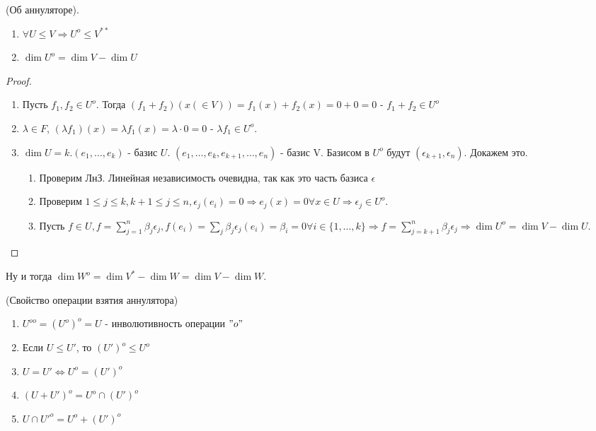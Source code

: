 \begin{theorem}
	(Об аннуляторе). \newline
	\begin{enumerate}
		\item \(\forall U\le V\Longrightarrow U^o \le V^{**}\)
		\item \(\dim U^o = \dim V - \dim U\)
	\end{enumerate}
\end{theorem}
\begin{proof}
	\begin{enumerate}
		\item Пусть \(f_1, f_2\in U^o\). Тогда \((f_1+f_2)(x(\in V)) = f_1(x) + f_2(x) = 0 + 0 = 0\) - \(f_1 + f_2\in U^o\)
		\item \(\lambda\in F\), \((\lambda f_1)(x) = \lambda f_1(x) = \lambda\cdot 0 = 0\) - \(\lambda f_1\in U^o\).
		\item \(\dim U = k. (e_1, \ldots, e_k)\) - базис \(U\). \((e_1, \ldots, e_k, e_{k+1}, \ldots, e_n)\) - базис V. Базисом в \(U^o\) будут \((\epsilon_{k+1}, \epsilon_n)\). Докажем это. 
		\begin{enumerate}
			\item Проверим ЛнЗ. Линейная независимость очевидна, так как это часть базиса \(\epsilon\)
			\item Проверим \(1\le j\le k, k+1\le j\le n, \epsilon_j(e_i) = 0\Longrightarrow e_j(x) = 0\forall x\in U\Longrightarrow \epsilon_j\in U^o\). 
			\item Пусть \(f\in U, f = \sum_{j=1}^{n}\beta_j\epsilon_j, f(e_i) = \sum_j \beta_j \epsilon_j(e_i) = \beta_i = 0 \forall i \in \{1,\ldots, k\} \Longrightarrow f = \sum_{j=k+1}^{n}\beta_j\epsilon_j\Longrightarrow \dim U^o = \dim V - \dim U\).
		\end{enumerate}
	\end{enumerate}
\end{proof}
Ну и тогда \(\dim W^o = \dim V^{*}-\dim W = \dim V - \dim W\).
\begin{theorem}
	(Свойство операции взятия аннулятора) \newline
	\begin{enumerate}
		\item \(U^{oo} = (U^o)^o = U\) - инволютивность операции \("o"\)
		\item Если \(U\le U'\), то \((U')^o \le U^o\)
		\item \(U = U' \Longleftrightarrow U^o = (U')^o\)
		\item \((U+U')^o = U^o \cap (U')^o\)
		\item \(U\cap U'^o = U^o + (U')^o\)
	\end{enumerate}
\end{theorem}
